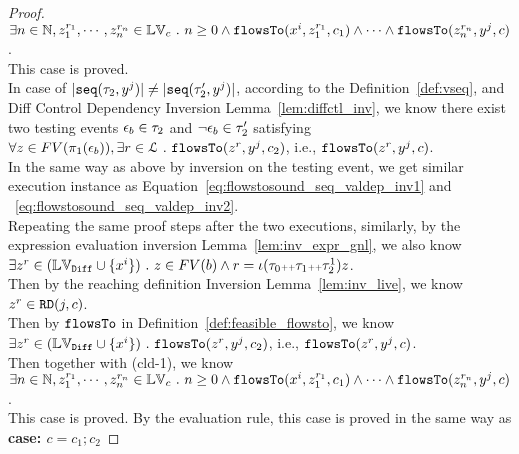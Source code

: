 \begin{proof}
$\exists n \in \mathbb{N}, z_1^{r_1}, \cdots, z_n^{r_n} \in \mathbb{LV}_{{c}} ~.~ n \geq 0 \land
\mathtt{flowsTo}(x^i,  z_1^{r_1}, c_1) 
\land \cdots \land \mathtt{flowsTo}(z_n^{r_n}, y^j, c)$.
\\
This case is proved.
\\
In case of $|\mathtt{seq}(\mathtt{\tau}_2, y^j)| \neq |\mathtt{seq}(\mathtt{\tau}_2', y^j)|$,  according to the Definition~\ref{def:vseq},
and {Diff Control Dependency Inversion Lemma~\ref{lem:diffctl_inv}}, we know 
there exist two testing events $\mathtt{\epsilon}_b \in \mathtt{\tau}_2$ and $\neg\mathtt{\epsilon}_b \in \mathtt{\tau}_2'$ satisfying 
\\
$\forall z \in FV(\pi_1(\mathtt{\epsilon}_b)), \exists r \in \mathcal{L} ~.~ \mathtt{flowsTo}(z^r, y^j, c_2)$, 
i.e., $\mathtt{flowsTo}(z^r, y^j, c)$.
\\
In the same way as above by inversion on the testing event, we get similar execution instance as 
Equation~\ref{eq:flowstosound_seq_valdep_inv1} and ~\ref{eq:flowstosound_seq_valdep_inv2}.
\\
Repeating the same proof steps after the two executions,
similarly, by the expression evaluation inversion Lemma~\ref{lem:inv_expr_gnl}, we also know 
\\
$\exists z^r \in (\mathbb{LV}_{\mathtt{Diff}} \cup \{x^i\} ) ~.~ z \in FV(b) 
\land r = \iota(\mathtt{\tau}_0 {\scriptscriptstyle ++} \mathtt{\tau}_1 {\scriptscriptstyle ++} \mathtt{\tau}_2^1) z$.
\\
Then by the reaching definition Inversion Lemma~\ref{lem:inv_live}, we know $z^r \in \mathtt{RD}(j, c)$.
\\
Then by $\mathtt{flowsTo}$ in Definition~\ref{def:feasible_flowsto}, 
we know 
$ \exists z^r \in (\mathbb{LV}_{\mathtt{Diff}} \cup \{x^i\} ) ~.~ \mathtt{flowsTo}(z^r, y^j, c_2)$, i.e., $\mathtt{flowsTo}(z^r, y^j, c)$.
\\
Then together with (cld-1),
we know 
\\
$\exists n \in \mathbb{N}, z_1^{r_1}, \cdots, z_n^{r_n} \in \mathbb{LV}_{{c}} ~.~ n \geq 0 \land
\mathtt{flowsTo}(x^i,  z_1^{r_1}, c_1) 
\land \cdots \land \mathtt{flowsTo}(z_n^{r_n}, y^j, c)$.
\\
This case is proved.
  By the evaluation rule, this case is proved in the same way as \textbf{case: $c = c_1; c_2$}
\end{proof}

